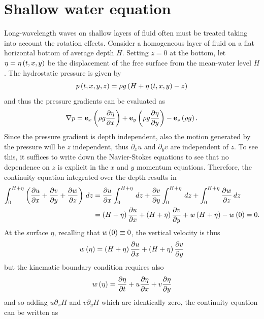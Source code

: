 \section{Shallow water equation}
Long-wavelength waves on shallow layers of fluid often must be treated taking into account the rotation effects. Consider a homogeneous layer of fluid on a flat horizontal bottom of average depth $H$. Setting $z=0$ at the bottom, let $\eta=\eta\left( t,x,y \right)$ be the displacement of the free surface from the mean-water level $H$. The hydrostatic pressure is given by 
\begin{equation}
p\left( t,x,y,z \right)=\rho g\left( H+\eta\left( t,x,y \right)-z \right)
\end{equation}
and thus the pressure gradients can be evaluated as
\begin{equation}
\nabla p=\mathbf{e}_{x}\left( \rho g\dfrac{\partial\eta}{\partial x} \right)+\mathbf{e}_{y}\left( \rho g\dfrac{\partial\eta}{\partial y} \right)-\mathbf{e}_{z}\left( \rho g \right).
\end{equation}
Since the pressure gradient is depth independent, also the motion generated by the pressure will be $z$ independent, thus $\partial_{x}u$ and $\partial_{y}v$ are independent of $z$. To see this, it suffices to write down the Navier-Stokes equations to see that no dependence on $z$ is explicit in the $x$ and $y$ momentum equations. Therefore, the continuity equation integrated over the depth results in 
\begin{align*}
\int_{0}^{H+\eta}\left( \dfrac{\partial u}{\partial x}+\dfrac{\partial v}{\partial y}+\dfrac{\partial w}{\partial z} \right)\,dz&=
\dfrac{\partial u}{\partial x}\int_{0}^{H+\eta}\,dz+\dfrac{\partial v}{\partial y}\int_{0}^{H+\eta}\,dz+\int_{0}^{H+\eta}\dfrac{\partial w}{\partial z}\,dz\\
&=\left( H+\eta \right)\dfrac{\partial u}{\partial x}+\left( H+\eta \right)\dfrac{\partial v}{\partial y}+w\left( H+\eta \right)-w\left( 0 \right)=0.
\end{align*}
At the surface $\eta$, recalling that $w\left( 0 \right)\equiv0$, the vertical velocity is thus 
\begin{equation*}
w\left( \eta \right)=\left( H+\eta \right)\dfrac{\partial u}{\partial x}+\left( H+\eta \right)\dfrac{\partial v}{\partial y}
\end{equation*}
but the kinematic boundary condition requires also
\begin{equation*}
w\left( \eta \right)=\dfrac{\partial \eta}{\partial t}+u\dfrac{\partial \eta}{\partial x}+v\dfrac{\partial \eta}{\partial y}
\end{equation*}
and so adding $u\partial_{x}H$ and $v\partial_{y}H$ which are identically zero, the continuity equation can be written as
